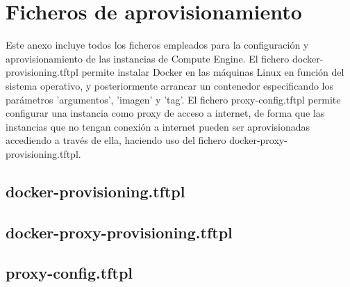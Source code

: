 \chapter{Ficheros de aprovisionamiento} \label{anx:aprov}
  Este anexo incluye todos los ficheros empleados para la configuración y aprovisionamiento de las instancias de Compute Engine. El fichero docker-provisioning.tftpl permite instalar Docker en las máquinas Linux en función del sistema operativo, y posteriormente arrancar un contenedor especificando los parámetros 'argumentos', 'imagen' y 'tag'. El fichero proxy-config.tftpl permite configurar una instancia como proxy de acceso a internet, de forma que las instancias que no tengan conexión a internet pueden ser aprovisionadas accediendo a través de ella, haciendo uso del fichero docker-proxy-provisioning.tftpl.

\section*{docker-provisioning.tftpl} 

\clearpage

\section*{docker-proxy-provisioning.tftpl} 


\section*{proxy-config.tftpl} 


